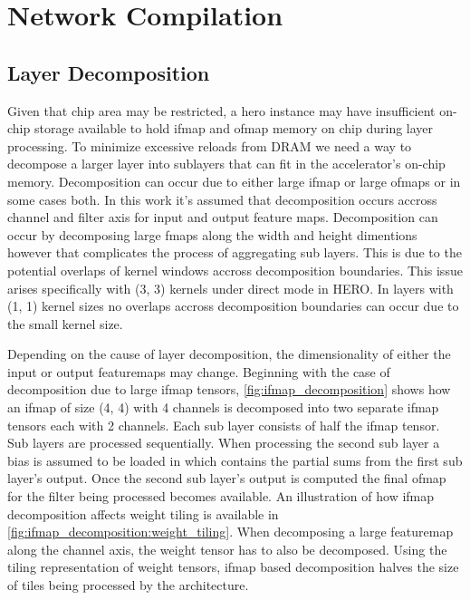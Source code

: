 \chapter{Network Compilation}
\label{chap:net_compile}

\section{Layer Decomposition}
\label{chap:net_compile:layer_decomposition}

Given that chip area may be restricted, a hero instance may have
insufficient on-chip storage available to hold ifmap and ofmap memory on chip
during layer processing. To minimize excessive reloads from DRAM we need a way to decompose a
larger layer into sublayers that can fit in the accelerator's on-chip memory.
Decomposition can occur due to either large ifmap or large ofmaps or in some cases
both. In this work it's assumed that decomposition occurs accross channel and
filter axis for input and output feature maps. Decomposition can occur by
decomposing large fmaps along the width and height dimentions however that
complicates the process of aggregating sub layers. This is due to the potential overlaps
of kernel windows accross decomposition boundaries. This issue arises
specifically with (3, 3) kernels under direct mode in HERO. In layers with (1,
1) kernel sizes no overlaps accross decomposition boundaries can occur due to
the small kernel size. 

Depending on the cause of layer decomposition, the dimensionality of either the
input or output featuremaps may change. Beginning with the case of decomposition due
to large ifmap tensors, \autoref{fig:ifmap_decomposition} shows how an ifmap
of size (4, 4) with 4 channels is decomposed into two separate ifmap tensors
each with 2 channels. Each sub layer consists of half the ifmap tensor. Sub
layers are processed sequentially. When
processing the second sub layer a bias is assumed to be loaded in which contains
the partial sums from the first sub layer's output. Once the second sub layer's
output is computed the final ofmap for the filter being processed becomes
available. An illustration of how ifmap decomposition affects weight tiling is
available in \autoref{fig:ifmap_decomposition:weight_tiling}. When decomposing a
large featuremap along the channel axis, the weight tensor has to also be
decomposed. Using the tiling representation of weight tensors, ifmap based
decomposition halves the size of tiles being processed by the architecture. 


